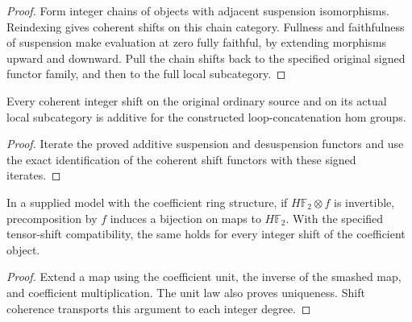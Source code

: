 \begin{proof}
  Form integer chains of objects with adjacent suspension isomorphisms. Reindexing gives coherent shifts on this chain category. Fullness and faithfulness of suspension make evaluation at zero fully faithful, by extending morphisms upward and downward. Pull the chain shifts back to the specified original signed functor family, and then to the full local subcategory.
  \leanok
\end{proof}

\begin{proposition}
  \label{prop:actual-additive-integer-shifts}
  \leanok
  Every coherent integer shift on the original ordinary source and on its actual local subcategory is additive for the constructed loop-concatenation hom groups.
\end{proposition}
\begin{proof}
  Iterate the proved additive suspension and desuspension functors and use the exact identification of the coherent shift functors with these signed iterates.
  \leanok
\end{proof}

\begin{proposition}
  \label{prop:coefficient-equivalence-cohomology}
  \leanok
  In a supplied model with the coefficient ring structure, if
  $H\mathbb F_2\otimes f$ is invertible, precomposition by $f$ induces
  a bijection on maps to $H\mathbb F_2$. With the specified tensor-shift
  compatibility, the same holds for every integer shift of the coefficient
  object.
\end{proposition}
\begin{proof}
  Extend a map using the coefficient unit, the inverse of the smashed
  map, and coefficient multiplication. The unit law also proves
  uniqueness. Shift coherence transports this argument to each integer
  degree.
  \leanok
\end{proof}

